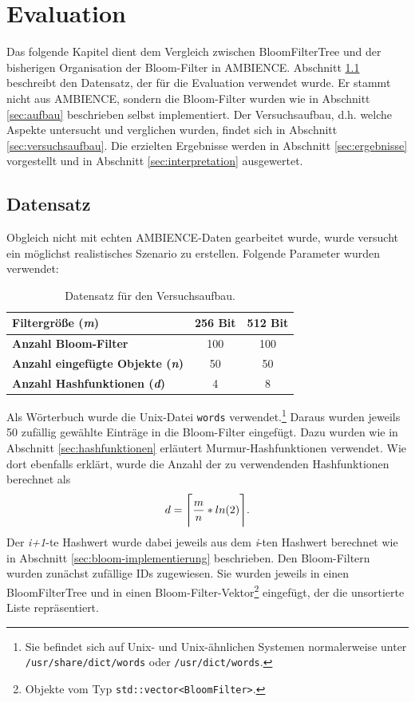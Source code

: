 \chapter{Evaluation}\label{ch:evaluation}
Das folgende Kapitel dient dem Vergleich zwischen BloomFilterTree und der bisherigen Organisation der Bloom-Filter in AMBIENCE. Abschnitt \ref{sec:datensatz} beschreibt den Datensatz, der für die Evaluation verwendet wurde. Er stammt nicht aus AMBIENCE, sondern die Bloom-Filter wurden wie in Abschnitt \ref{sec:aufbau} beschrieben selbst implementiert. Der Versuchsaufbau, d.h. welche Aspekte untersucht und verglichen wurden, findet sich in Abschnitt \ref{sec:versuchsaufbau}. Die erzielten Ergebnisse werden in Abschnitt \ref{sec:ergebnisse} vorgestellt und in Abschnitt \ref{sec:interpretation} ausgewertet.
\section{Datensatz}\label{sec:datensatz}
Obgleich nicht mit echten AMBIENCE-Daten gearbeitet wurde, wurde versucht ein möglichst realistisches Szenario zu erstellen. Folgende Parameter wurden verwendet:
\begin{center}
\begin{table}[htbp]
{\small
\begin{center}
\begin{tabular}[center]{lcc}
\toprule
\textbf{Filtergröße (\textit{m})} & 256 Bit & 512 Bit\\
\midrule
\textbf{Anzahl Bloom-Filter} & 100 & 100\\
\midrule
\textbf{Anzahl eingefügte Objekte (\textit{n})} & 50 & 50\\
\midrule
\textbf{Anzahl Hashfunktionen (\textit{d})} & 4 & 8\\
\bottomrule
\end{tabular}
\end{center}
} %
\caption[Datensatz für den Versuchsaufbau]{Datensatz für den Versuchsaufbau.\label{tab:Datensatz}}
\end{table}
\end{center}
Als Wörterbuch wurde die Unix-Datei \texttt{words} verwendet.\footnote{Sie befindet sich auf Unix- und Unix-ähnlichen Systemen normalerweise unter \texttt{/usr/share/dict/words} oder \texttt{/usr/dict/words}.} Daraus wurden jeweils 50 zufällig gewählte Einträge in die Bloom-Filter eingefügt. Dazu wurden wie in Abschnitt \ref{sec:hashfunktionen} erläutert Murmur-Hashfunktionen verwendet. Wie dort ebenfalls erklärt, wurde die Anzahl der zu verwendenden Hashfunktionen berechnet als 
\[d = \Ceil[\Bigg]{\frac{m}{n} * ln(2)}.\]
\noindent
Der \textit{i+1}-te Hashwert wurde dabei jeweils aus dem \textit{i}-ten Hashwert berechnet wie in Abschnitt \ref{sec:bloom-implementierung} beschrieben. Den Bloom-Filtern wurden zunächst zufällige IDs zugewiesen. Sie wurden jeweils in einen BloomFilterTree und in einen Bloom-Filter-Vektor\footnote{Objekte vom Typ \texttt{std::vector<BloomFilter>}.} eingefügt, der die unsortierte Liste repräsentiert.
\newpage
